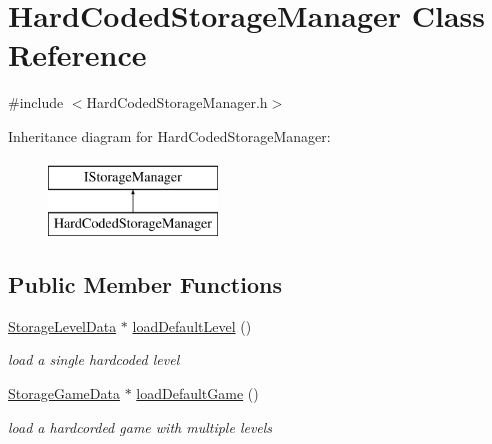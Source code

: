 \hypertarget{class_hard_coded_storage_manager}{}\section{Hard\+Coded\+Storage\+Manager Class Reference}
\label{class_hard_coded_storage_manager}


{\ttfamily \#include $<$Hard\+Coded\+Storage\+Manager.\+h$>$}

Inheritance diagram for Hard\+Coded\+Storage\+Manager\+:\begin{figure}[H]
\begin{center}
\leavevmode
\includegraphics[height=2.000000cm]{class_hard_coded_storage_manager}
\end{center}
\end{figure}
\subsection*{Public Member Functions}
\begin{DoxyCompactItemize}
\item 
\mbox{\label{class_hard_coded_storage_manager_acfe4d38c419fafa983a2081ee002005b}} 
\mbox{\hyperlink{class_storage_level_data}{Storage\+Level\+Data}} $\ast$ \mbox{\hyperlink{class_hard_coded_storage_manager_acfe4d38c419fafa983a2081ee002005b}{load\+Default\+Level}} ()
\begin{DoxyCompactList}\small\item\em load a single hardcoded level \end{DoxyCompactList}\item 
\mbox{\label{class_hard_coded_storage_manager_a648f4c3b2e6de65fc4603e9ce4d5fc6d}} 
\mbox{\hyperlink{class_storage_game_data}{Storage\+Game\+Data}} $\ast$ \mbox{\hyperlink{class_hard_coded_storage_manager_a648f4c3b2e6de65fc4603e9ce4d5fc6d}{load\+Default\+Game}} ()
\begin{DoxyCompactList}\small\item\em load a hardcorded game with multiple levels \end{DoxyCompactList}\end{DoxyCompactItemize}


